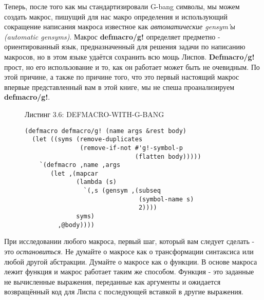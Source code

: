 Теперь, после того как мы стандартизировали G-bang символы, мы можем создать макрос, пишущий для нас макро определения и использующий сокращение написания макроса известное как \emph{автоматические gensym'ы ({automatic gensyms})}. Макрос \textbf{defmacro/g!} определяет предметно - ориентированный язык, предназначенный для решения задачи по написанию макросов, но в этом языке удаётся сохранить всю мощь Лиспов. \textbf{Defmacro/g!} прост, но его использование и то, как он работает может быть не очевидным. По этой причине, а также по причине того, что это первый настоящий макрос впервые представленный вам в этой книге, мы не спеша проанализируем \textbf{defmacro/g!}.

\begin{figure}Листинг 3.6: DEFMACRO-WITH-G-BANG\label{listing_3.6}
\listbegin
\begin{verbatim}
(defmacro defmacro/g! (name args &rest body)
  (let ((syms (remove-duplicates
               (remove-if-not #'g!-symbol-p
                              (flatten body)))))
    `(defmacro ,name ,args
       (let ,(mapcar
              (lambda (s)
                `(,s (gensym ,(subseq
                               (symbol-name s)
                               2))))
              syms)
         ,@body))))
\end{verbatim}
\listend
\end{figure}

При исследовании любого макроса, первый шаг, который вам следует сделать - это \emph{остановиться}. Не думайте о макросе как о трансформации синтаксиса или любой другой абстракции. Думайте о макросе как о функции. В основе макроса лежит функция и макрос работает таким же способом. Функция - это заданные не вычисленные выражения, переданные как аргументы и ожидается возвращённый код для Лиспа с последующей вставкой в другие выражения.

